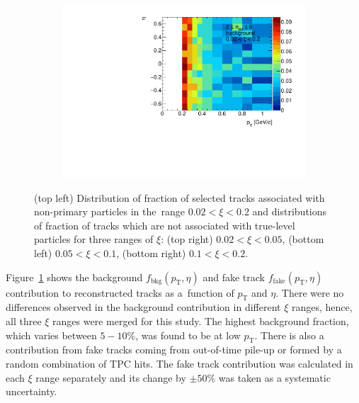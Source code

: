 \begin{figure}[h!]
\begin{subfigure}{.45\textwidth}
	\end{subfigure}
	\begin{subfigure}{.45\textwidth}
		\includegraphics[width=\linewidth, page=5]{chapters/chrgSTAR/img/chargedBkg/bkg2D.pdf}
	\end{subfigure}
	\caption{(top left) Distribution of fraction of selected tracks  associated with non-primary particles  in the~range $0.02<\xi<0.2$ and distributions of fraction of tracks which are not associated with true-level particles for three ranges of $\xi$: (top right) $0.02<\xi<0.05$, (bottom left) $0.05<\xi<0.1$, (bottom right) $0.1<\xi<0.2$.}
	\label{fig:bkg_fake_charged}
\end{figure}

Figure~\ref{fig:bkg_fake_charged} shows the background $f_{\textrm{bkg}}\left(p_{\textrm{T}},\eta\right)$ and fake track $f_{\textrm{fake}}\left(p_{\textrm{T}},\eta\right)$ contribution to reconstructed tracks as a~function of $p_{\textrm{T}}$ and $\eta$. There were no differences observed in the background contribution in different $\xi$ ranges, hence, all three $\xi$ ranges were merged for this study. The highest background fraction, which varies between $5-10\%$, was found to be at low $p_{\textrm{T}}$. There is also a contribution from fake tracks coming from out-of-time pile-up or  formed by a random combination of TPC hits. The fake track contribution was calculated in each $\xi$ range separately and its change by $\pm50\%$ was taken as a systematic uncertainty.




